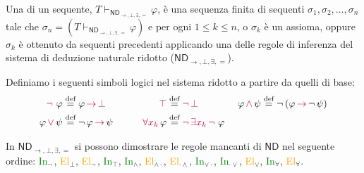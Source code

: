 \begin{definition}[Dimostrazione in $\mathsf{ND}_{\to, \bot, \exists, =}$]
    Una  di un sequente, $T \vdash_{\mathsf{ND}_{\to, \bot, \exists, =}} \varphi$, è una sequenza finita di sequenti $\sigma_1, \sigma_2, \ldots, \sigma_n$ tale che
    $\sigma_n = (T \vdash_{\mathsf{ND}_{\to, \bot, \exists, =}} \varphi)$ e per ogni $1 \leq k \leq n$, o $\sigma_k$ è un assioma, oppure $\sigma_k$ è ottenuto da sequenti precedenti applicando una delle regole di inferenza del sistema di deduzione naturale ridotto ($\mathsf{ND}_{\to, \bot, \exists, =}$).
\end{definition}

\begin{definition}[$\purple{\neg \,, \top, \land, \lor, \forall}$]
    Definiamo i seguenti simboli logici nel sistema ridotto a partire da quelli di base:
    \begin{alignat*}{4}
        \textcolor{purple}{\neg \,}\,\varphi &\overset{\text{def}}{=} \varphi \,\textcolor{purple}{\to}\, \textcolor{purple}{\bot} \qquad & \textcolor{purple}{\top} &\overset{\text{def}}{=} \textcolor{purple}{\neg \,\bot} \qquad\quad & \varphi \,\textcolor{purple}{\land}\, \psi &\overset{\text{def}}{=} \neg \,(\varphi \,\textcolor{purple}{\to}\, \neg \,\psi) \\
        \varphi \,\textcolor{purple}{\lor}\, \psi &\overset{\text{def}}{=} \neg \,\varphi \,\textcolor{purple}{\to}\, \psi \qquad & \textcolor{purple}{\forall x_k}\,\varphi &\overset{\text{def}}{=} \textcolor{purple}{\neg \,\exists x_k\,\neg \,}\,\varphi
    \end{alignat*}
\end{definition}

\begin{exercise}[$\mathsf{ND}_{\to, \bot, \exists, =}$ dimostra $\mathsf{ND}$]
    In $\mathsf{ND}_{\to, \bot, \exists, =}$ si possono dimostrare le regole mancanti di $\mathsf{ND}$ nel seguente ordine: 
    \textcolor{green}{In}$_{\neg \,}$, \textcolor{orange}{El}$_{\bot}$, \textcolor{orange}{El}$_{\neg \,}$, \textcolor{green}{In}$_{\top}$, \textcolor{green}{In}$_{\land}$, \textcolor{orange}{El}$_{\land\cdot}$, \textcolor{orange}{El}$_{\cdot\land}$, \textcolor{green}{In}$_{\lor\cdot}$, \textcolor{green}{In}$_{\cdot\lor}$,
    \textcolor{orange}{El}$_{\lor}$, \textcolor{green}{In}$_{\forall}$, \textcolor{orange}{El}$_{\forall}$. 
\end{exercise}

